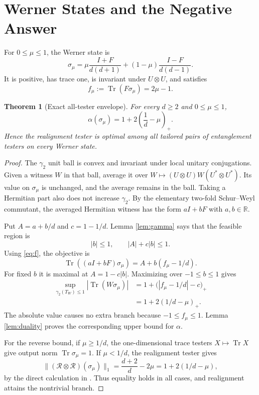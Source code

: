 \documentclass[11pt]{amsart}
\newtheorem{theorem}{Theorem}
\newcommand{\Tr}{\operatorname{Tr}}
\newcommand{\gammatwo}{\gamma_2}
\begin{document}
\section*{Werner States and the Negative Answer}

For $0\leq\mu\leq1$, the Werner state \cite{Werner,JLN} is
\begin{equation}\label{eq:werner}
 \sigma_\mu=
 \mu\frac{I+F}{d(d+1)}+(1-\mu)\frac{I-F}{d(d-1)}.
\end{equation}
It is positive, has trace one, is invariant under $U\otimes U$, and satisfies
\begin{equation}\label{eq:f}
 f_\mu:=\Tr(F\sigma_\mu)=2\mu-1.
\end{equation}

\begin{theorem}[Exact all-tester envelope]\label{thm:envelope}
For every $d\geq2$ and $0\leq\mu\leq1$,
\begin{equation}\label{eq:envelope}
 \alpha(\sigma_\mu)=1+2\left(\frac1d-\mu\right)_+.
\end{equation}
Hence the realignment tester is optimal among all tailored pairs of
entanglement testers on every Werner state.
\end{theorem}

\begin{proof}
The $\gammatwo$ unit ball is convex and invariant under local unitary
conjugations.  Given a witness $W$ in that ball, average it over
$W\mapsto(U\otimes U)W(U^*\otimes U^*)$.  Its value on $\sigma_\mu$ is
unchanged, and the average remains in the ball.  Taking a Hermitian part also
does not increase $\gammatwo$.  By the elementary two-fold Schur--Weyl
commutant, the averaged Hermitian witness has the form $aI+bF$ with
$a,b\in\mathbb R$.

Put $A=a+b/d$ and $c=1-1/d$.  Lemma \ref{lem:gamma} says that the feasible
region is
\[
 |b|\leq1,\qquad |A|+c|b|\leq1.
\]
Using \eqref{eq:f}, the objective is
\[
 \Tr((aI+bF)\sigma_\mu)=A+b(f_\mu-1/d).
\]
For fixed $b$ it is maximal at $A=1-c|b|$.  Maximizing over
$-1\leq b\leq1$ gives
\begin{align*}
 \sup_{\gammatwo(T_W)\leq1}|\Tr(W\sigma_\mu)|
 &=1+\bigl(|f_\mu-1/d|-c\bigr)_+\\
 &=1+2(1/d-\mu)_+.
\end{align*}
The absolute value causes no extra branch because
$-1\leq f_\mu\leq1$.  Lemma \ref{lem:duality} proves the corresponding
upper bound for $\alpha$.

For the reverse bound, if $\mu\geq1/d$, the one-dimensional trace testers
$X\mapsto\Tr X$ give output norm $\Tr\sigma_\mu=1$.  If $\mu<1/d$, the
realignment tester gives
\[
 \|(\mathcal R\otimes\mathcal R)(\sigma_\mu)\|_1
 =\frac{d+2}{d}-2\mu
 =1+2(1/d-\mu),
\]
by the direct calculation in \cite[Section 9]{JLN}.  Thus equality holds in
all cases, and realignment attains the nontrivial branch.
\end{proof}
\end{document}
